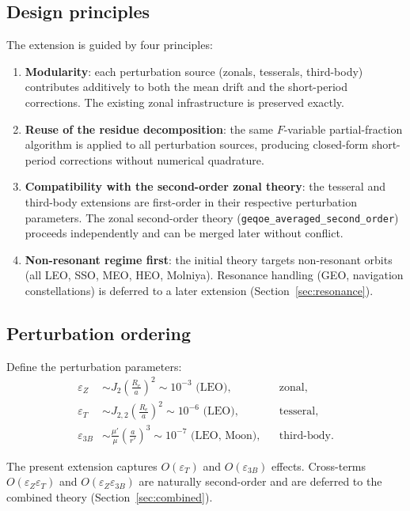 \documentclass[11pt]{article}
\newcommand{\eps}{\varepsilon}
\newcommand{\secondorder}{geqoe\_averaged\_second\_order}
\begin{document}
\subsection{Design principles}

The extension is guided by four principles:

\begin{enumerate}
    \item \textbf{Modularity}: each perturbation source (zonals, tesserals,
    third-body) contributes additively to both the mean drift and the
    short-period corrections. The existing zonal infrastructure is
    preserved exactly.

    \item \textbf{Reuse of the residue decomposition}: the same
    $F$-variable partial-fraction algorithm is applied to all perturbation
    sources, producing closed-form short-period corrections without
    numerical quadrature.

    \item \textbf{Compatibility with the second-order zonal theory}: the
    tesseral and third-body extensions are first-order in their respective
    perturbation parameters. The zonal second-order theory
    (\texttt{\secondorder{}}) proceeds independently and can be merged
    later without conflict.

    \item \textbf{Non-resonant regime first}: the initial theory targets
    non-resonant orbits (all LEO, SSO, MEO, HEO, Molniya). Resonance
    handling (GEO, navigation constellations) is deferred to a later
    extension (Section~\ref{sec:resonance}).
\end{enumerate}

\subsection{Perturbation ordering}

Define the perturbation parameters:
\begin{align}
\eps_Z &\sim J_2 \left(\frac{R_e}{a}\right)^2
\sim 10^{-3} \text{ (LEO)},
& &\text{zonal}, \\
\eps_T &\sim J_{2,2} \left(\frac{R_e}{a}\right)^2
\sim 10^{-6} \text{ (LEO)},
& &\text{tesseral}, \\
\eps_{3B} &\sim \frac{\mu'}{\mu}\left(\frac{a}{r'}\right)^3
\sim 10^{-7} \text{ (LEO, Moon)},
& &\text{third-body}.
\end{align}

The present extension captures $O(\eps_T)$ and $O(\eps_{3B})$ effects.
Cross-terms $O(\eps_Z \eps_T)$ and $O(\eps_Z \eps_{3B})$ are naturally
second-order and are deferred to the combined theory
(Section~\ref{sec:combined}).
\end{document}
